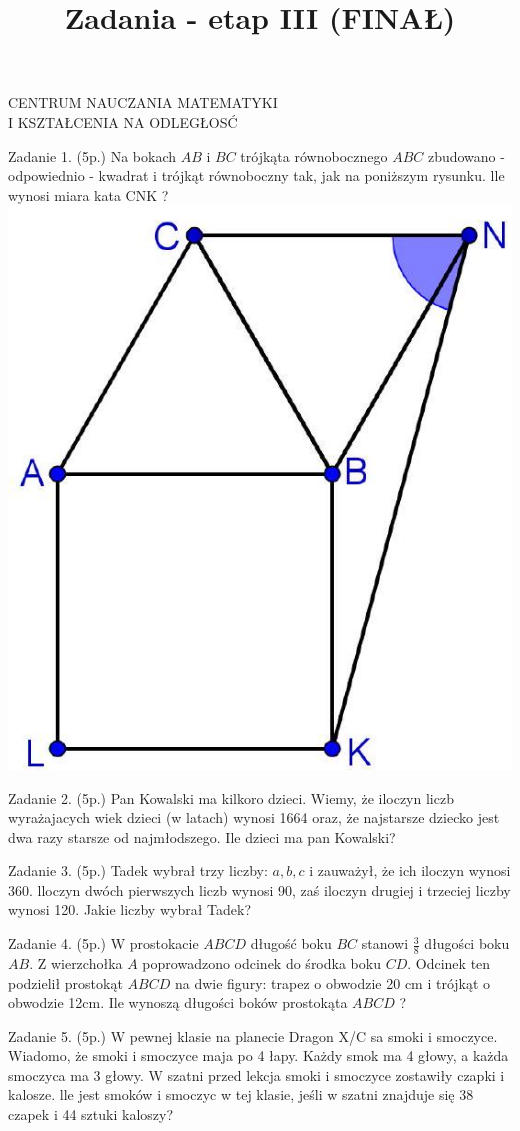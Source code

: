 \documentclass[10pt]{article}
\title{Zadania - etap III (FINAŁ) }
\author{}
\date{}
\begin{document}
\maketitle
CENTRUM NAUCZANIA MATEMATYKI\\
I KSZTAŁCENIA NA ODLEGŁOSĆ

Zadanie 1. (5p.) Na bokach \(A B\) i \(B C\) trójkąta równobocznego \(A B C\) zbudowano - odpowiednio - kwadrat i trójkąt równoboczny tak, jak na poniższym rysunku. lle wynosi miara kata CNK ?\\
\includegraphics[max width=\textwidth, center]{2024_11_21_802b58213c5ab9fa2b63g-1}

Zadanie 2. (5p.) Pan Kowalski ma kilkoro dzieci. Wiemy, że iloczyn liczb wyrażajacych wiek dzieci (w latach) wynosi 1664 oraz, że najstarsze dziecko jest dwa razy starsze od najmłodszego. Ile dzieci ma pan Kowalski?

Zadanie 3. (5p.) Tadek wybrał trzy liczby: \(a, b, c\) i zauważył, że ich iloczyn wynosi 360. lloczyn dwóch pierwszych liczb wynosi 90, zaś iloczyn drugiej i trzeciej liczby wynosi 120. Jakie liczby wybrał Tadek?

Zadanie 4. (5p.) W prostokacie \(A B C D\) długość boku \(B C\) stanowi \(\frac{3}{8}\) długości boku \(A B\). Z wierzchołka \(A\) poprowadzono odcinek do środka boku \(C D\). Odcinek ten podzielił prostokąt \(A B C D\) na dwie figury: trapez o obwodzie 20 cm i trójkąt o obwodzie 12cm. Ile wynoszą długości boków prostokąta \(A B C D\) ?

Zadanie 5. (5p.) W pewnej klasie na planecie Dragon X/C sa smoki i smoczyce. Wiadomo, że smoki i smoczyce maja po 4 łapy. Każdy smok ma 4 głowy, a każda smoczyca ma 3 głowy. W szatni przed lekcja smoki i smoczyce zostawiły czapki i kalosze. lle jest smoków i smoczyc w tej klasie, jeśli w szatni znajduje się 38 czapek i 44 sztuki kaloszy?
\end{document}
